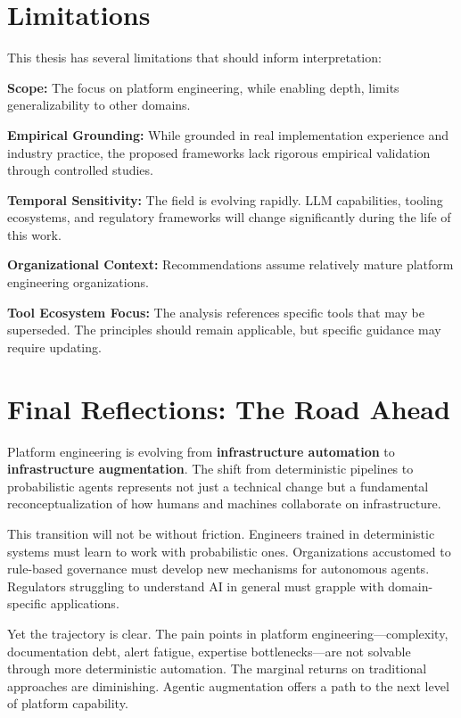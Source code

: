 \section{Limitations}
\label{sec:conclusion-limitations}

This thesis has several limitations that should inform interpretation:

\textbf{Scope:} The focus on platform engineering, while enabling depth, limits generalizability to other domains.

\textbf{Empirical Grounding:} While grounded in real implementation experience and industry practice, the proposed frameworks lack rigorous empirical validation through controlled studies.

\textbf{Temporal Sensitivity:} The field is evolving rapidly. LLM capabilities, tooling ecosystems, and regulatory frameworks will change significantly during the life of this work.

\textbf{Organizational Context:} Recommendations assume relatively mature platform engineering organizations.

\textbf{Tool Ecosystem Focus:} The analysis references specific tools that may be superseded. The principles should remain applicable, but specific guidance may require updating.

\section{Final Reflections: The Road Ahead}
\label{sec:final-reflections}

Platform engineering is evolving from \textbf{infrastructure automation} to \textbf{infrastructure augmentation}. The shift from deterministic pipelines to probabilistic agents represents not just a technical change but a fundamental reconceptualization of how humans and machines collaborate on infrastructure.

This transition will not be without friction. Engineers trained in deterministic systems must learn to work with probabilistic ones. Organizations accustomed to rule-based governance must develop new mechanisms for autonomous agents. Regulators struggling to understand AI in general must grapple with domain-specific applications.

Yet the trajectory is clear. The pain points in platform engineering---complexity, documentation debt, alert fatigue, expertise bottlenecks---are not solvable through more deterministic automation. The marginal returns on traditional approaches are diminishing. Agentic augmentation offers a path to the next level of platform capability.

